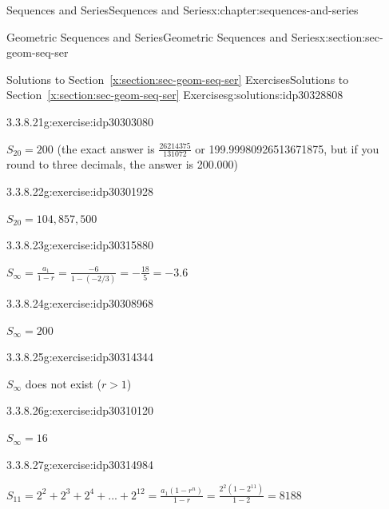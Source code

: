 \documentclass[twoside,10pt,]{book}
\newcommand{\xreffont}{\relax}
\numberwithin{equation}{section}
\newcommand{\infinity}{{\infty}}
\newcommand{\gt}{>}
\begin{document}
\begin{chapterptx}{Sequences and Series}{}{Sequences and Series}{}{}{x:chapter:sequences-and-series}
\begin{sectionptx}{Geometric Sequences and Series}{}{Geometric Sequences and Series}{}{}{x:section:sec-geom-seq-ser}
\begin{solutions-subsection}{Solutions to Section~{\xreffont\ref*{x:section:sec-geom-seq-ser}} Exercises}{}{Solutions to Section~{\xreffont\ref*{x:section:sec-geom-seq-ser}} Exercises}{}{}{g:solutions:idp30328808}
\begin{divisionsolution}{3.3.8.21}{}{g:exercise:idp30303080}%
\par\smallskip%
\noindent\hypertarget{g:solution:idp30306920-main}{}\(S_{20} = 200\) (the exact answer is \(\frac{{26214375}}{{131072}}\) or 199.99980926513671875, but if you round to three decimals, the answer is 200.000)\end{divisionsolution}%
\begin{divisionsolution}{3.3.8.22}{}{g:exercise:idp30301928}%
\par\smallskip%
\noindent\hypertarget{g:solution:idp30310376-main}{}\(S_{20} = 104,857,500\)\end{divisionsolution}%
\begin{exercisegroup}
\begin{divisionsolutioneg}{3.3.8.23}{}{g:exercise:idp30315880}%
\par\smallskip%
\noindent\hypertarget{g:solution:idp30308712-main}{}\({S_\infty } = \frac{{{a_1}}}{{1 - r}} = \frac{{ - 6}}{{1 - \left( { - 2/3} \right)}} =  - \frac{{18}}{5} =  - 3.6\)\end{divisionsolutioneg}%
\begin{divisionsolutioneg}{3.3.8.24}{}{g:exercise:idp30308968}%
\par\smallskip%
\noindent\hypertarget{g:solution:idp30316776-main}{}\(S_\infinity = 200\)\end{divisionsolutioneg}%
\begin{divisionsolutioneg}{3.3.8.25}{}{g:exercise:idp30314344}%
\par\smallskip%
\noindent\hypertarget{g:solution:idp30309224-main}{}\(S_\infinity\) does not exist (\(r \gt 1\))\end{divisionsolutioneg}%
\begin{divisionsolutioneg}{3.3.8.26}{}{g:exercise:idp30310120}%
\par\smallskip%
\noindent\hypertarget{g:solution:idp30311144-main}{}\(S_\infinity = 16\)\end{divisionsolutioneg}%
\end{exercisegroup}
\par\medskip\noindent
\begin{exercisegroup}
\begin{divisionsolutioneg}{3.3.8.27}{}{g:exercise:idp30314984}%
\par\smallskip%
\noindent\hypertarget{g:solution:idp30314728-main}{}\({S_{11}} = {2^2} + {2^3} + {2^4} + ... + {2^{12}} = \frac{{{a_1}(1 - {r^n})}}{{1 - r}} = \frac{{{2^2}(1 - {2^{11}})}}{{1 - 2}}= 8188\)\end{divisionsolutioneg}%

\end{exercisegroup}
\end{solutions-subsection}
\end{sectionptx}
\end{chapterptx}
\end{document}
